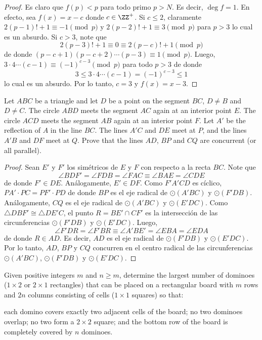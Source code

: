 \begin{proof}
	Es claro que $f(p)<p$ para todo primo $p>N$. Es decir, $\deg f=1$. En efecto, sea $f(x)=x-c$ donde $c\in\ZZ^+$. Si $c\le 2$, claramente $2(p-1)!+1\equiv -1\pmod p$ y $2(p-2)!+1\equiv 3\pmod p$ para $p>3$ lo cual es un absurdo. Si $c>3$, note que
	\[2(p-3)!+1\equiv 0\equiv 2(p-c)!+1\pmod p\]
	de donde $(p-c+1)(p-c+2)\cdots(p-3)\equiv 1\pmod p$. Luego, $3\cdot 4\cdots(c-1)\equiv(-1)^{c-3}\pmod p$ para todo $p>3$ de donde
	\[3\le 3\cdot 4\cdots(c-1)=(-1)^{c-3}\le 1\]
	lo cual es un absurdo. Por lo tanto, $c=3$ y $f(x)=x-3$.
\end{proof}

\begin{probEG}[RMM 2016/1]
	Let $ABC$ be a triangle and let $D$ be a point on the segment $BC$, $D\ne B$ and $D\ne C$. The circle $ABD$ meets the segment $AC$ again at an interior point $E$. The circle $ACD$ meets the segment $AB$ again at an interior point $F$. Let $A'$ be the reflection of $A$ in the line $BC$. The lines $A'C$ and $DE$ meet at $P$, and the lines $A'B$ and $DF$ meet at $Q$. Prove that the lines $AD$, $BP$ and $CQ$ are concurrent (or all parallel).
\end{probEG}

\begin{proof}
	Sean $E'$ y $F'$ los simétricos de $E$ y $F$ con respecto a la recta $BC$. Note que
	\[\angle BDF'=\angle FDB=\angle FAC\equiv\angle BAE=\angle CDE\]
	de donde $F'\in DE$. Análogamente, $E'\in DF$. Como $F'A'CD$ es cíclico, $PA'\cdot PC=PF'\cdot PD$ de donde $BP$ es el eje radical de $\odot(A'BC)$ y $\odot(F'DB)$. Análogamente, $CQ$ es el eje radical de $\odot(A'BC)$ y $\odot(E'DC)$. Como $\triangle DBF'\cong\triangle DE'C$, el punto $R=BE'\cap CF'$ es la intersección de las circunferencias $\odot(F'DB)$ y $\odot(E'DC)$. Luego,
	\[\angle F'DR=\angle F'BR\equiv\angle A'BE'=\angle EBA=\angle EDA\]
	de donde $R\in AD$. Es decir, $AD$ es el eje radical de $\odot(F'DB)$ y $\odot(E'DC)$. Por lo tanto, $AD$, $BP$ y $CQ$ concurren en el centro radical de las circunferencias $\odot(A'BC)$, $\odot(F'DB)$ y $\odot(E'DC)$.
\end{proof}

\begin{probHR}[RMM 2016/2]
	Given positive integers $m$ and $n\ge m$, determine the largest number of dominoes ($1\times 2$ or $2\times 1$ rectangles) that can be placed on a rectangular board with $m$ rows and $2n$ columns consisting of cells ($1\times 1$ squares) so that:
	\begin{enumerate}[(1)]
		\ii each domino covers exactly two adjacent cells of the board;
		\ii no two dominoes overlap;
		\ii no two form a $2\times 2$ square; and
		\ii the bottom row of the board is completely covered by $n$ dominoes.
	\end{enumerate}
\end{probHR}

